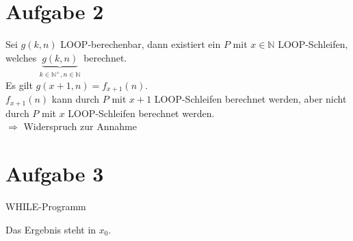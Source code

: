 \documentclass[a4paper,12pt]{article}
\begin{document}
	\section*{Aufgabe 2}
	Sei $g\left(k, n\right)$ LOOP-berechenbar, dann existiert ein $P$ mit $x \in \mathbb{N}$ LOOP-Schleifen, welches $\underbrace{g\left(k, n\right)}_{k \in \mathbb{N^+}, n \in \mathbb{N}}$ berechnet.\\
	Es gilt $g\left(x+1, n\right) = f_{x+1}\left(n\right)$.\\
	$f_{x+1}\left(n\right)$ kann durch $P$ mit $x+1$ LOOP-Schleifen berechnet werden, aber nicht durch $P$ mit $x$ LOOP-Schleifen berechnet werden.\\
	$\Rightarrow$ Widerspruch zur Annahme
	
	\section*{Aufgabe 3}
	\begin{algorithm}[H]
		
		\caption{WHILE-Programm}
	\end{algorithm}
	Das Ergebnis steht in $x_0$.
	
\end{document}
